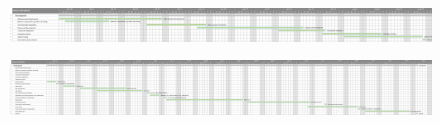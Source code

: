 \begin{figure}
	\centering
	\includegraphics[width=\textwidth,height=\dimexpr\textheight-4\baselineskip-\abovecaptionskip-\belowcaptionskip\relax,keepaspectratio]{schedule/Develop1.png}
\end{figure}
\begin{figure}
	\centering
	\includegraphics[width=\textwidth,height=\dimexpr\textheight-4\baselineskip-\abovecaptionskip-\belowcaptionskip\relax,keepaspectratio]{schedule/Develop2.png}
\end{figure}